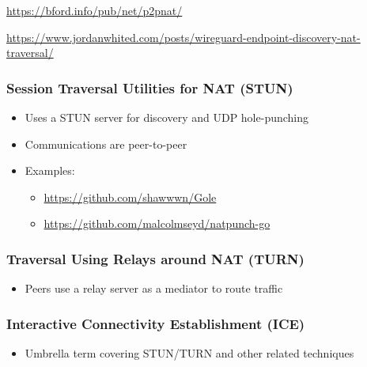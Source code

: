 \url{https://bford.info/pub/net/p2pnat/}

\url{https://www.jordanwhited.com/posts/wireguard-endpoint-discovery-nat-traversal/}

\hypertarget{session-traversal-utilities-for-nat-stun}{%
\subsubsection{Session Traversal Utilities for NAT
(STUN)}\label{session-traversal-utilities-for-nat-stun}}

\begin{itemize}
\tightlist
\item
  Uses a STUN server for discovery and UDP hole-punching
\item
  Communications are peer-to-peer
\item
  Examples:

  \begin{itemize}
  \tightlist
  \item
    \url{https://github.com/shawwwn/Gole}
  \item
    \url{https://github.com/malcolmseyd/natpunch-go}
  \end{itemize}
\end{itemize}

\hypertarget{traversal-using-relays-around-nat-turn}{%
\subsubsection{Traversal Using Relays around NAT
(TURN)}\label{traversal-using-relays-around-nat-turn}}

\begin{itemize}
\tightlist
\item
  Peers use a relay server as a mediator to route traffic
\end{itemize}

\hypertarget{interactive-connectivity-establishment-ice}{%
\subsubsection{Interactive Connectivity Establishment
(ICE)}\label{interactive-connectivity-establishment-ice}}

\begin{itemize}
\tightlist
\item
  Umbrella term covering STUN/TURN and other related techniques
\end{itemize}

